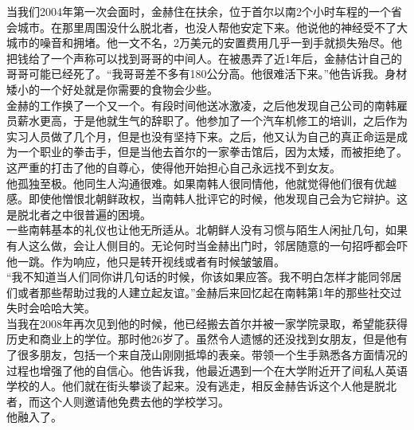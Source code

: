 \begin{multicols}{\theparacolNo}
当我们2004年第一次会面时，金赫住在扶余，位于首尔以南2个小时车程的一个省会城市。在那里周围没什么脱北者，也没人帮他安定下来。他说他的神经受不了大城市的噪音和拥堵。他一文不名，2万美元的安置费用几乎一到手就损失殆尽。他把钱给了一个声称可以找到哥哥的中间人。在被愚弄了近1年后，金赫估计自己的哥哥可能已经死了。“我哥哥差不多有180公分高。他很难活下来。”他告诉我。身材矮小的一个好处就是你需要的食物会少些。\\

金赫的工作换了一个又一个。有段时间他送冰激凌，之后他发现自己公司的南韩雇员薪水更高，于是他就生气的辞职了。他参加了一个汽车机修工的培训，之后作为实习人员做了几个月，但是也没有坚持下来。之后，他又认为自己的真正命运是成为一个职业的拳击手，但是当他去首尔的一家拳击馆后，因为太矮，而被拒绝了。这严重的打击了他的自尊心，使得他开始担心自己永远找不到女友。\\

他孤独至极。他同生人沟通很难。如果南韩人很同情他，他就觉得他们很有优越感。即使他憎恨北朝鲜政权，当南韩人批评它的时候，他发现自己会为它辩护。这是脱北者之中很普遍的困境。\\

一些南韩基本的礼仪也让他无所适从。北朝鲜人没有习惯与陌生人闲扯几句，如果有人这么做，会让人侧目的。无论何时当金赫出门时，邻居随意的一句招呼都会吓他一跳。作为响应，他只是转开视线或者有时候皱皱眉。\\

“我不知道当人们同你讲几句话的时候，你该如果应答。我不明白怎样才能同邻居们或者那些帮助过我的人建立起友谊。”金赫后来回忆起在南韩第1年的那些社交过失时会哈哈大笑。\\

当我在2008年再次见到他的时候，他已经搬去首尔并被一家学院录取，希望能获得历史和商业上的学位。那时他26岁了。虽然令人遗憾的还没找到女朋友，但是他有了很多朋友，包括一个来自茂山刚刚抵埠的表亲。带领一个生手熟悉各方面情况的过程也增强了他的自信心。他告诉我，他最近遇到一个在大学附近开了间私人英语学校的人。他们就在街头攀谈了起来。没有逃走，相反金赫告诉这个人他是脱北者，而这个人则邀请他免费去他的学校学习。\\

他融入了。\\
\ifnum{}
	\end{multicols}
\fi